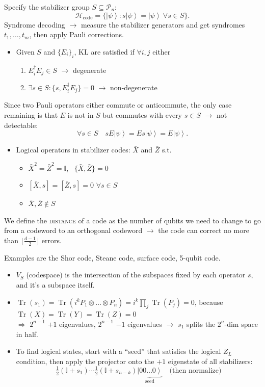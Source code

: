 \documentclass[11pt,a4paper]{article}
\renewcommand{\ket}[1]{\left|#1\right\rangle}
\newcommand{\Tr}{\operatorname{Tr}}
\newcommand{\Hil}{\mathcal{H}}
\newcommand{\id}{\mathbb{I}}
\begin{document}
Specify the stabilizer group $S\subseteq\mathcal P_n$:
\[
\Hil_{\text{code}} = \bigl\{\ket\psi : s\ket\psi = \ket\psi\ \forall s\in S\bigr\}.
\]
Syndrome decoding $\to$ measure the stabilizer generators and get syndromes $t_1,\dots,t_m$, then apply Pauli corrections.
\begin{itemize}
  \item Given $S$ and $\{E_i\}_i$, KL are satisfied if $\forall i,j$ either
  \begin{enumerate}[label=\alph*)]
    \item $E_i^\dagger E_j\in S$ \quad$\to$ degenerate
    \item $\exists s\in S: \{s, E_i^\dagger E_j\} = 0$ \quad$\to$ non-degenerate
  \end{enumerate}
\end{itemize}

Since two Pauli operators either commute or anticommute, the only case remaining is that $E$ is not in $S$ but commutes with every $s\in S$ $\to$ not detectable:
\[
\forall s\in S\quad sE\ket\psi = Es\ket\psi = E\ket\psi.
\]
\begin{itemize}
  \item Logical operators in stabilizer codes: $\bar X$ and $\bar Z$ s.t.
  \begin{itemize}
    \item $\bar X^2 = \bar Z^2 = \id$, \ $\{\bar X,\bar Z\} = 0$
    \item $[\bar X,s] = [\bar Z,s] = 0$ $\forall s\in S$
    \item $\bar X,\bar Z\notin S$
  \end{itemize}
\end{itemize}
We define the \textsc{distance} of a code as the number of qubits we need to change to go from a codeword to an orthogonal codeword $\to$ the code can correct no more than $\bigl\lfloor\frac{d-1}{2}\bigr\rfloor$ errors.

Examples are the Shor code, Steane code, surface code, 5-qubit code.
\begin{itemize}
  \item $V_S$ (codespace) is the intersection of the subspaces fixed by each operator $s$, and it's a subspace itself.
  \item $\Tr(s_1) = \Tr(i^kP_1\otimes\dots\otimes P_n) = i^k\prod_j\Tr(P_j) = 0$, because $\Tr(X) = \Tr(Y) = \Tr(Z) = 0$\\
  $\Rightarrow$ $2^{n-1}$ $+1$ eigenvalues, $2^{n-1}$ $-1$ eigenvalues $\to$ $s_1$ splits the $2^n$-dim space in half.
  \item To find logical states, start with a ``seed'' that satisfies the logical $Z_L$ condition, then apply the projector onto the $+1$ eigenstate of all stabilizers:
  \[
  \tfrac{1}{2}(\id + s_1)\cdots\tfrac{1}{2}(\id + s_{n-k})\underbrace{\ket{00\dots0}}_{\text{seed}}\quad\text{(then normalize)}
  \]
\end{itemize}
\end{document}
